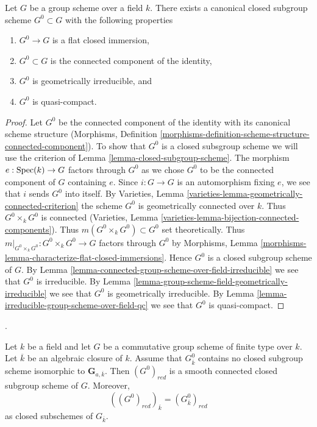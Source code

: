 \begin{proposition}
\label{proposition-connected-component}
Let $G$ be a group scheme over a field $k$. There exists a canonical closed
subgroup scheme $G^0 \subset G$ with the following properties
\begin{enumerate}
\item $G^0 \to G$ is a flat closed immersion,
\item $G^0 \subset G$ is the connected component of the identity,
\item $G^0$ is geometrically irreducible, and
\item $G^0$ is quasi-compact.
\end{enumerate}
\end{proposition}

\begin{proof}
Let $G^0$ be the connected component of the identity with its canonical
scheme structure (Morphisms, Definition
\ref{morphisms-definition-scheme-structure-connected-component}).
To show that $G^0$ is a closed subsgroup scheme we will use the
criterion of Lemma \ref{lemma-closed-subgroup-scheme}.
The morphism $e : \mathop{\mathrm{Spec}}(k) \to G$ factors through $G^0$ as we chose
$G^0$ to be the connected component of $G$ containing $e$.
Since $i : G \to G$ is an automorphism fixing $e$, we see that
$i$ sends $G^0$ into itself.
By Varieties, Lemma \ref{varieties-lemma-geometrically-connected-criterion}
the scheme $G^0$ is geometrically connected over $k$.
Thus $G^0 \times_k G^0$ is connected
(Varieties, Lemma \ref{varieties-lemma-bijection-connected-components}).
Thus $m(G^0 \times_k G^0) \subset G^0$ set theoretically.
Thus $m|_{G^0 \times_k G^0} : G^0 \times_k G^0 \to G$
factors through $G^0$ by
Morphisms, Lemma \ref{morphisms-lemma-characterize-flat-closed-immersions}.
Hence $G^0$ is a closed subgroup scheme of $G$.
By Lemma \ref{lemma-connected-group-scheme-over-field-irreducible}
we see that $G^0$ is irreducible. By
Lemma \ref{lemma-group-scheme-field-geometrically-irreducible}
we see that $G^0$ is geometrically irreducible. By
Lemma \ref{lemma-irreducible-group-scheme-over-field-qc}
we see that $G^0$ is quasi-compact.
\end{proof}

\begin{lemma}
\label{lemma-reduced-identity-component-no-additive}
\begin{reference}
\cite[Expos\'e 236, Proposition 3.1, p. 236 and correction,
p. 303]{FGA}.
\end{reference}
Let $k$ be a field and let $G$ be a commutative group scheme of finite type
over $k$. Let $\overline{k}$ be an algebraic closure of $k$. Assume that
$G^0_{\overline{k}}$ contains no closed subgroup scheme isomorphic to
$\mathbf{G}_{a, \overline{k}}$. Then $(G^0)_{red}$ is a smooth connected
closed subgroup scheme of $G$. Moreover,
$$
((G^0)_{red})_{\overline{k}}=(G^0_{\overline{k}})_{red}
$$
as closed subschemes of $G_{\overline{k}}$.
\end{lemma}

